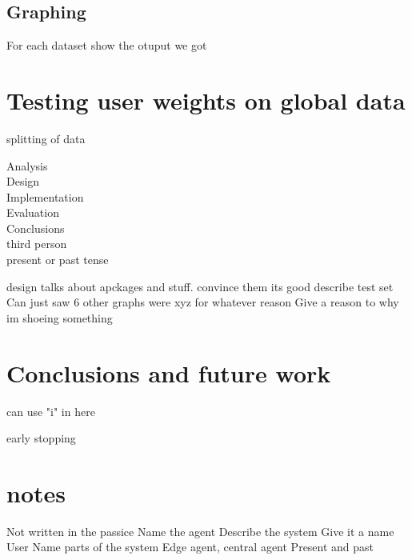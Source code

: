 \documentclass[12pt]{article}
\begin{document}
\subsection{Graphing}
For each dataset show the otuput we got

\clearpage
\section{Testing user weights on global data}
splitting of data 

Analysis\\
Design\\
Implementation\\
Evaluation\\
Conclusions\\

third person
\\
present or past tense

design talks about apckages and stuff. convince them its good
describe test set
Can just saw 6 other graphs were xyz for whatever reason
Give a reason to why im shoeing something

\clearpage
\section{Conclusions and future work}
can use "i" in here

early stopping

\section{notes}
Not written in the passice
	Name the agent
	Describe the system
		Give it a name
		User
		Name parts of the system
		Edge agent, central agent
Present and past
\clearpage
\printbibliography[title={Bibliography}]
\end{document}
